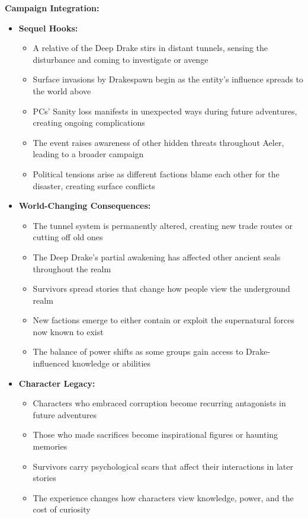 \documentclass[11pt]{article}
\begin{document}
\textbf{Campaign Integration:}
\begin{itemize}
\item \textbf{Sequel Hooks:}
  \begin{itemize}
  \item A relative of the Deep Drake stirs in distant tunnels, sensing the disturbance and coming to investigate or avenge
  \item Surface invasions by Drakespawn begin as the entity's influence spreads to the world above
  \item PCs' Sanity loss manifests in unexpected ways during future adventures, creating ongoing complications
  \item The event raises awareness of other hidden threats throughout Aeler, leading to a broader campaign
  \item Political tensions arise as different factions blame each other for the disaster, creating surface conflicts
  \end{itemize}
\item \textbf{World-Changing Consequences:}
  \begin{itemize}
  \item The tunnel system is permanently altered, creating new trade routes or cutting off old ones
  \item The Deep Drake's partial awakening has affected other ancient seals throughout the realm
  \item Survivors spread stories that change how people view the underground realm
  \item New factions emerge to either contain or exploit the supernatural forces now known to exist
  \item The balance of power shifts as some groups gain access to Drake-influenced knowledge or abilities
  \end{itemize}
\item \textbf{Character Legacy:}
  \begin{itemize}
  \item Characters who embraced corruption become recurring antagonists in future adventures
  \item Those who made sacrifices become inspirational figures or haunting memories
  \item Survivors carry psychological scars that affect their interactions in later stories
  \item The experience changes how characters view knowledge, power, and the cost of curiosity
  \end{itemize}
\end{itemize}
\end{document}
